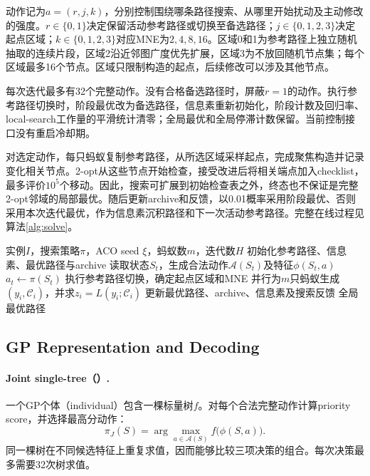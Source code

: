 动作记为$a=(r,j,k)$，分别控制围绕哪条路径搜索、从哪里开始扰动及主动修改的强度。$r\in\{0,1\}$决定保留活动参考路径或切换至备选路径；$j\in\{0,1,2,3\}$决定起点区域；$k\in\{0,1,2,3\}$对应MNE为$2,4,8,16$。区域0和1为参考路径上独立随机抽取的连续片段，区域2沿近邻图广度优先扩展，区域3为不放回随机节点集；每个区域最多16个节点。区域只限制构造的起点，后续修改可以涉及其他节点。

每次迭代最多有32个完整动作。没有合格备选路径时，屏蔽$r=1$的动作。执行参考路径切换时，阶段最优改为备选路径，信息素重新初始化，阶段计数及回归率、local-search工作量的平滑统计清零；全局最优和全局停滞计数保留。当前控制接口没有重启冷却期。

对选定动作，每只蚂蚁复制参考路径，从所选区域采样起点，完成聚焦构造并记录变化相关节点。2-opt从这些节点开始检查，接受改进后将相关端点加入checklist，最多评价$10^5$个移动。因此，搜索可扩展到初始检查表之外，终态也不保证是完整2-opt邻域的局部最优。随后更新archive和反馈，以0.01概率采用阶段最优、否则采用本次迭代最优，作为信息素沉积路径和下一次活动参考路径。完整在线过程见算法\ref{alg:solve}。

\begin{algorithm}[tb]
\caption{FACO求解与GP控制}
\label{alg:solve}
\begin{algorithmic}[1]
\Require 实例$I$，搜索策略$\pi$，ACO seed $\xi$，蚂蚁数$m$，迭代数$H$
\State 初始化参考路径、信息素、最优路径与archive
 \State 读取状态$S_t$，生成合法动作$\mathcal A(S_t)$及特征$\phi(S_t,a)$
 \State $a_t\gets\pi(S_t)$ 
 \State 执行参考路径切换，确定起点区域和MNE
 \State 并行为$m$只蚂蚁生成$(y_i,\mathcal C_i)$，并求$z_i=L(y_i;\mathcal C_i)$
 \State 更新最优路径、archive、信息素及搜索反馈
\EndFor
\State \Return 全局最优路径
\end{algorithmic}
\end{algorithm}

\subsection{GP Representation and Decoding}
\paragraph{Joint single-tree（\JS{}）.}
一个GP个体（individual）包含一棵标量树$f$。对每个合法完整动作计算priority score，并选择最高分动作：
\begin{equation}
 \pi_J(S)=\arg\max_{a\in\mathcal A(S)}f\bigl(\phi(S,a)\bigr).
\end{equation}
同一棵树在不同候选特征上重复求值，因而能够比较三项决策的组合。每次决策最多需要32次树求值。

